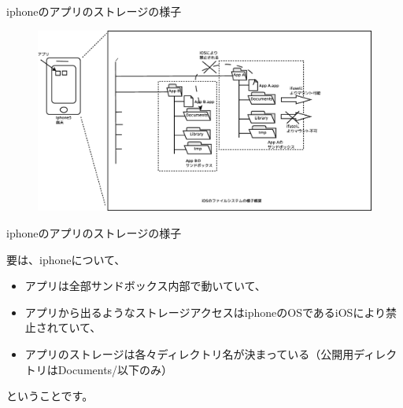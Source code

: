 \begin{frame}{iphoneのアプリのストレージの様子}
\begin{figure}[H]
\begin{center}
 \includegraphics[width=1.0\hsize]{image201403/iphone-app-fs-overview.eps}
\end{center}
\end{figure}
\end{frame}

\begin{frame}{iphoneのアプリのストレージの様子}

 要は、iphoneについて、

\begin{itemize}
\item アプリは全部サンドボックス内部で動いていて、
\item アプリから出るようなストレージアクセスはiphoneのOSであるiOSにより禁止されていて、
\item アプリのストレージは各々ディレクトリ名が決まっている（公開用ディレクトリはDocuments/以下のみ）
\end{itemize}
ということです。

\end{frame}

